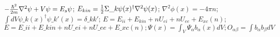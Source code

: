 \documentclass[preview]{standalone}
\begin{document}
$ -{\hbar^2 \over 2 m} \nabla^2 \psi + V \psi = E_{s} \psi   $;
$ E_{kin} = {1 \over 2} \Sigma\_{k} \psi(x)^{\dagger} \nabla^2 \psi(x) $; 
$ \nabla^{2} \phi(x) = -4 \pi n  $;
$\int dV \psi\_{k}(x)^{\dagger} \psi\_{k'}(x) = \delta\_{kk'}$;
$ E = E_{ii} + E_{kin} + n U_{ei} + n U_{ee} + E_{xc}(n)   $;
$ E = E\_{ii} + E\_{kin} + n U\_{ei} + n U\_{ee} + E\_{xc}(n); \Psi(x)= \int_{V} \Psi_{\alpha} b_{\alpha}(x) dV; O_{\alpha \beta} = \int b_{\alpha} b_{\beta} dV  $
\end{document}
